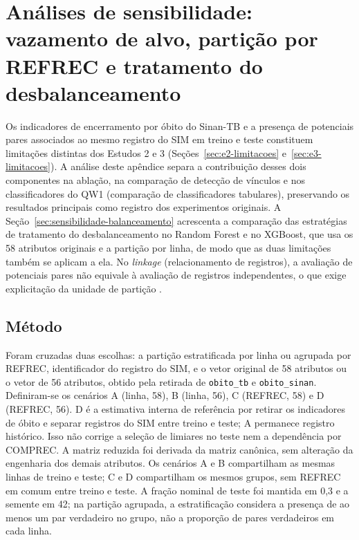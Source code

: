 \chapter{Análises de sensibilidade: vazamento de alvo, partição por REFREC e tratamento do desbalanceamento}\label{ap:sensibilidade}

Os indicadores de encerramento por óbito do Sinan-TB e a presença de potenciais pares associados ao mesmo registro do SIM em treino e teste constituem limitações distintas dos Estudos 2 e 3 (Seções~\ref{sec:e2-limitacoes} e~\ref{sec:e3-limitacoes}). A análise deste apêndice separa a contribuição desses dois componentes na ablação, na comparação de detecção de vínculos e nos classificadores do QW1 (comparação de classificadores tabulares), preservando os resultados principais como registro dos experimentos originais. A Seção~\ref{sec:sensibilidade-balanceamento} acrescenta a comparação das estratégias de tratamento do desbalanceamento no Random Forest e no XGBoost, que usa os 58 atributos originais e a partição por linha, de modo que as duas limitações também se aplicam a ela. No \textit{linkage} (relacionamento de registros), a avaliação de potenciais pares não equivale à avaliação de registros independentes, o que exige explicitação da unidade de partição \cite{Jardim2026phdrepo}.

\section{Método}

Foram cruzadas duas escolhas: a partição estratificada por linha ou agrupada por REFREC, identificador do registro do SIM, e o vetor original de 58 atributos ou o vetor de 56 atributos, obtido pela retirada de \texttt{obito\_tb} e \texttt{obito\_sinan}. Definiram-se os cenários A (linha, 58), B (linha, 56), C (REFREC, 58) e D (REFREC, 56). D é a estimativa interna de referência por retirar os indicadores de óbito e separar registros do SIM entre treino e teste; A permanece registro histórico. Isso não corrige a seleção de limiares no teste nem a dependência por COMPREC. A matriz reduzida foi derivada da matriz canônica, sem alteração da engenharia dos demais atributos. Os cenários A e B compartilham as mesmas linhas de treino e teste; C e D compartilham os mesmos grupos, sem REFREC em comum entre treino e teste. A fração nominal de teste foi mantida em 0,3 e a semente em 42; na partição agrupada, a estratificação considera a presença de ao menos um par verdadeiro no grupo, não a proporção de pares verdadeiros em cada linha.


